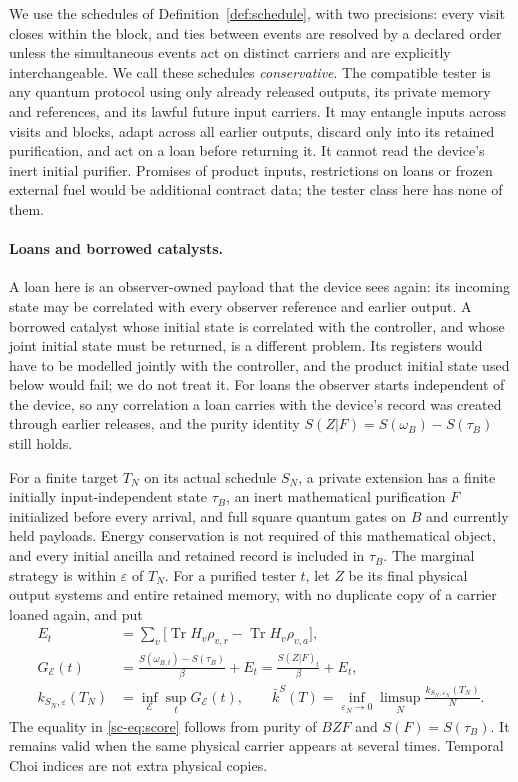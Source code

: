 \documentclass[11pt]{article}
\theoremstyle{definition}
\theoremstyle{remark}
\newcommand{\Tr}{\operatorname{Tr}}
\providecommand{\eps}{\varepsilon}
\begin{document}
We use the schedules of Definition~\ref{def:schedule}, with two precisions: every visit closes within the block, and ties between events are resolved by a declared order unless the simultaneous events act on distinct carriers and are explicitly interchangeable. We call these schedules \emph{conservative}.
The compatible tester is any quantum protocol using only already released outputs, its private memory and references, and its lawful future input carriers. It may entangle inputs across visits and blocks, adapt across all earlier outputs, discard only into its retained purification, and act on a loan before returning it. It cannot read the device's inert initial purifier. Promises of product inputs, restrictions on loans or frozen external fuel would be additional contract data; the tester class here has none of them.

\paragraph{Loans and borrowed catalysts.}
A loan here is an observer-owned payload that the device sees again: its incoming state may be correlated with every observer reference and earlier output. A borrowed catalyst whose initial state is correlated with the controller, and whose joint initial state must be returned, is a different problem. Its registers would have to be modelled jointly with the controller, and the product initial state used below would fail; we do not treat it. For loans the observer starts independent of the device, so any correlation a loan carries with the device's record was created through earlier releases, and the purity identity $S(Z|F)=S(\omega_B)-S(\tau_B)$ still holds.

For a finite target $T_N$ on its actual schedule $S_N$, a private extension has a finite initially input-independent state $\tau_B$, an inert mathematical purification $F$ initialized before every arrival, and full square quantum gates on $B$ and currently held payloads. Energy conservation is not required of this mathematical object, and every initial ancilla and retained record is included in $\tau_B$. The marginal strategy is within $\eps$ of $T_N$. For a purified tester $t$, let $Z$ be its final physical output systems and entire retained memory, with no duplicate copy of a carrier loaned again, and put
\begin{align}
E_t&=\sum_v\bigl[\Tr H_v\rho_{v,r}-\Tr H_v\rho_{v,a}\bigr],\label{sc-eq:flux}\\
G_{\mathcal E}(t)&=\frac{S(\omega_{B,t})-S(\tau_B)}{\beta}+E_t
=\frac{S(Z|F)_t}{\beta}+E_t,\label{sc-eq:score}\\
k_{S_N,\eps}(T_N)&=\inf_{\mathcal E}\sup_tG_{\mathcal E}(t),\qquad
\bar k^S(T)=\inf_{\eps_N\to0}\limsup_N\frac{k_{S_N,\eps_N}(T_N)}{N}.\label{sc-eq:rate}
\end{align}
The equality in \eqref{sc-eq:score} follows from purity of $BZF$ and $S(F)=S(\tau_B)$. It remains valid when the same physical carrier appears at several times. Temporal Choi indices are not extra physical copies.
\end{document}
